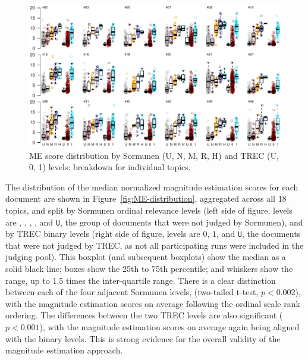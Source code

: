 \begin{figure}[tp]
  \centering
  \includegraphics[width=\linewidth,page=1]{figs/check_gross_ranks_med_all.pdf} %
  \caption{ME score distribution by Sormunen (U, N, M, R, H) and TREC (U, 0, 1) levels:
    breakdown for individual topics.
  \label{fig:ME-distribution-breakdown}
   }
\end{figure}

The distribution of the median normalized magnitude estimation scores for
each document are shown in Figure~\ref{fig:ME-distribution}, aggregated
across all 18 topics, and split by Sormunen ordinal relevance levels
(left side of figure, levels are 
\nn, \mm, \rr, \hh, and {\tt U}, the group of documents that were not judged
by Sormunen), and by TREC binary levels (right side of figure, levels
are $0$, $1$, and {\tt U}, the documents that were not judged by TREC, as not all participating runs were
included in the judging pool).
This boxplot (and subsequent boxplots) show the median as a solid black
line; boxes show the 25th to 75th percentile; and whiskers show the
range, up to 1.5 times the inter-quartile range.
There is a clear distinction between each of the four adjacent
Sormunen levels, (two-tailed t-test, $p<0.002$), 
with the magnitude estimation scores on average following the
ordinal scale rank ordering.
The differences between the two TREC levels are also significant
($p<0.001$), with the magnitude estimation scores on average again being
aligned with the binary levels.
This is strong evidence for the overall validity of the 
magnitude estimation approach.


